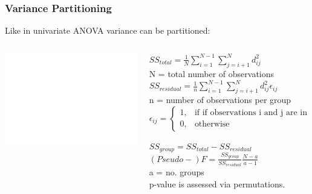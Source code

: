 \documentclass[10pt]{beamer}\usepackage[]{graphicx}\usepackage[]{color}
\renewcommand{\footnotesize}{\scriptsize}
\begin{document}
\begin{frame}[fragile]
  \frametitle{Variance Partitioning}
  Like in univariate ANOVA variance can be partitioned:
  \begin{columns}
  \begin{column}{5cm}
    \includegraphics<1->[height=0.4\textheight]{pics/Anderson_2001_SST.pdf}\\
  \end{column}
  \begin{column}{5cm}
  $SS_{total} = \frac{1}{N} \sum\limits_{i=1}^{N-1} \sum\limits_{j=i+1}^{N} d_{ij}^2$ \\
  \tiny N = total number of observations \\[2em] \normalsize \pause
  $SS_{residual} = \frac{1}{n} \sum\limits_{i=1}^{N-1} \sum\limits_{j=i+1}^{N} d_{ij}^2 \epsilon_{ij}$\\
  \tiny n = number of observations per group \\ 
  $\epsilon_{ij} = 
  \begin{cases}
    1,& \text{if }  \text{if observations i and j are in the same group}\\
    0,& \text{otherwise}
  \end{cases}$ \\[2em] \normalsize \pause
  
  $SS_{group} = SS_{total} - SS_{residual}$ \\[2em] \pause
  $(Pseudo-) F = \frac{SS_{group}}{SS_{residual}} \frac{N-a}{a-1}$\\
  
  \tiny a = no. groups\\[1em]
  \footnotesize
  p-value is assessed via permutations.
  \end{column}
  \end{columns}
\end{frame}
\end{document}
